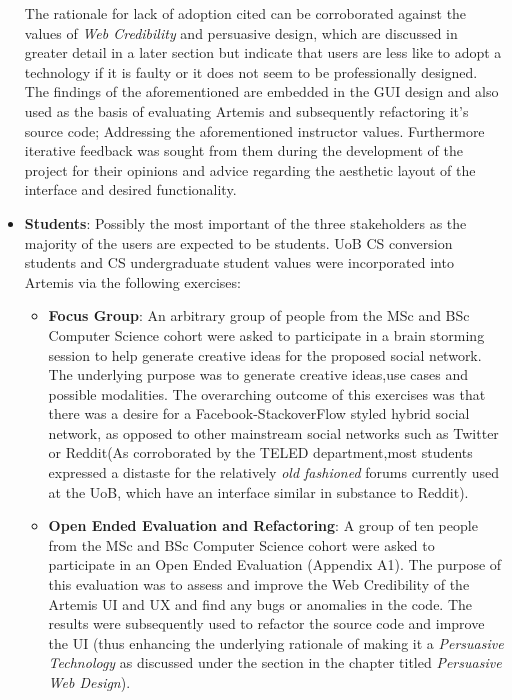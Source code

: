 \begin{itemize}
    
    The rationale for lack of adoption cited can be corroborated against the values of \textit{Web Credibility} and persuasive design, which are discussed in greater detail in a later section but indicate that users are less like to adopt a technology if it is faulty or it does not seem to be professionally designed. The findings of the aforementioned are embedded in the GUI design and also used as the basis of evaluating Artemis and subsequently refactoring it's source code; Addressing the aforementioned instructor values. Furthermore iterative feedback was sought from them during the development of the project for their opinions and advice regarding the aesthetic layout of the interface and desired functionality.


    \item \textbf{Students}: Possibly the most important of the three stakeholders as the majority of the users are expected to be students. UoB CS conversion students and CS undergraduate student values were incorporated into Artemis via the following exercises:
    
    \begin{itemize}
        
        \item \textbf{Focus Group}: An arbitrary group of people from the MSc and BSc Computer Science cohort were asked to participate in a brain storming session to help generate creative ideas for the proposed social  network. The underlying purpose was to generate creative ideas,use cases and possible modalities. The overarching outcome of this exercises was that there was a desire for a Facebook-StackoverFlow styled hybrid social network, as opposed to other mainstream social networks such as Twitter or Reddit(As corroborated by the TELED department,most students expressed a distaste for the relatively \textit{old fashioned} forums currently used at the UoB, which have an interface similar in substance to Reddit).

        \item \textbf{Open Ended Evaluation and Refactoring}:  A group of ten people from the MSc and BSc Computer Science cohort were asked to participate in an Open Ended Evaluation (Appendix A1). The purpose of this evaluation was to assess and improve the Web Credibility of the Artemis UI and UX  and find any bugs or anomalies in the code. The results were subsequently used to refactor the source code and improve the UI (thus enhancing the underlying rationale of making it a \textit{Persuasive Technology} as discussed under the section in the chapter titled \textit{Persuasive Web Design}).
        

\end{itemize}
\end{itemize}
